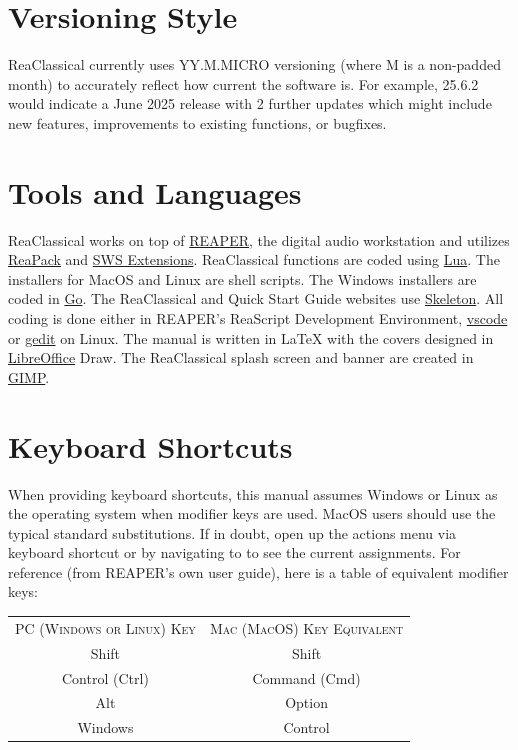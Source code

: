 \documentclass[10pt,american]{article}
\begin{document}
\section{Versioning Style}

ReaClassical currently uses YY.M.MICRO versioning (where M is a non-padded
month) to accurately reflect how current the software is. For example, 25.6.2
would indicate a June 2025 release with 2 further updates which might include
new features, improvements to existing functions, or bugfixes. 

\section{Tools and Languages}

ReaClassical works on top of \href{https://www.reaper.fm/}{REAPER}, the digital
audio workstation and utilizes \href{https://reapack.com/}{ReaPack} and
\href{https://www.sws-extension.org/index.php}{SWS Extensions}. ReaClassical
functions are coded using \href{https://www.lua.org/}{Lua}. The installers for
MacOS and Linux are shell scripts. The Windows installers are coded in
\href{https://go.dev/}{Go}. The ReaClassical and Quick Start Guide websites use
\href{http://getskeleton.com/}{Skeleton}. All coding is done either in REAPER's
ReaScript Development Environment, \href{https://code.visualstudio.com/}{vscode}
or \href{https://gedit-technology.github.io/apps/gedit/}{gedit} on Linux. The
manual is written in \LaTeX{} with the covers designed in
\href{https://www.libreoffice.org/}{LibreOffice} Draw. The ReaClassical splash
screen and banner are created in \href{https://www.gimp.org/}{GIMP}.

\section{Keyboard Shortcuts}

When providing keyboard shortcuts, this manual assumes Windows or Linux as the
operating system when modifier keys are used. MacOS users should use the typical
standard substitutions. If in doubt, open up the actions menu via keyboard
shortcut  or by navigating to  to
see the current assignments. For reference (from REAPER's own user guide), here
is a table of equivalent modifier keys:
\begin{center}
\begin{tabular}{cc}
\toprule 
\addlinespace
\textsc{PC (Windows or Linux) Key} & \textsc{Mac (MacOS) Key
Equivalent}\tabularnewline\addlinespace
\midrule
\addlinespace
\midrule 
Shift & Shift\tabularnewline
\midrule 
Control (Ctrl) & Command (Cmd)\tabularnewline
\midrule 
Alt & Option\tabularnewline
\midrule 
Windows & Control\tabularnewline
\bottomrule
\end{tabular}
\par\end{center}
\end{document}

